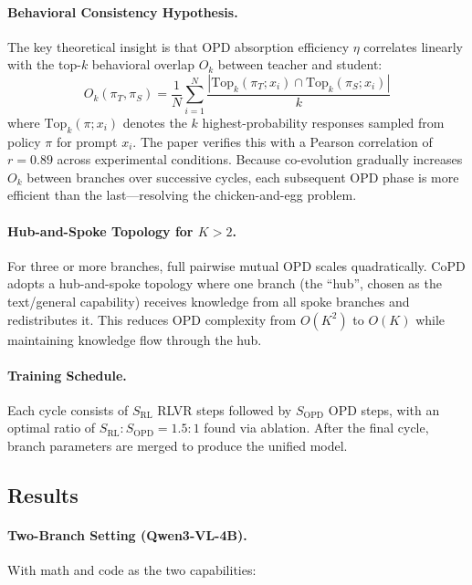 \documentclass[11pt]{article}
\begin{document}
\paragraph{Behavioral Consistency Hypothesis.}
The key theoretical insight is that OPD absorption efficiency $\eta$ correlates linearly with the top-$k$ behavioral overlap $O_k$ between teacher and student:
\begin{equation}
    O_k(\pi_T, \pi_S) = \frac{1}{N} \sum_{i=1}^{N} \frac{|\mathrm{Top}_k(\pi_T; x_i) \cap \mathrm{Top}_k(\pi_S; x_i)|}{k}
\end{equation}
where $\mathrm{Top}_k(\pi; x_i)$ denotes the $k$ highest-probability responses sampled from policy $\pi$ for prompt $x_i$. The paper verifies this with a Pearson correlation of $r = 0.89$ across experimental conditions. Because co-evolution gradually increases $O_k$ between branches over successive cycles, each subsequent OPD phase is more efficient than the last---resolving the chicken-and-egg problem.

\paragraph{Hub-and-Spoke Topology for $K > 2$.}
For three or more branches, full pairwise mutual OPD scales quadratically. CoPD adopts a hub-and-spoke topology where one branch (the ``hub'', chosen as the text/general capability) receives knowledge from all spoke branches and redistributes it. This reduces OPD complexity from $O(K^2)$ to $O(K)$ while maintaining knowledge flow through the hub.

\paragraph{Training Schedule.}
Each cycle consists of $S_{\mathrm{RL}}$ RLVR steps followed by $S_{\mathrm{OPD}}$ OPD steps, with an optimal ratio of $S_{\mathrm{RL}} : S_{\mathrm{OPD}} = 1.5 : 1$ found via ablation. After the final cycle, branch parameters are merged to produce the unified model.

\subsection{Results}

\paragraph{Two-Branch Setting (Qwen3-VL-4B).}
With math and code as the two capabilities:
\end{document}
